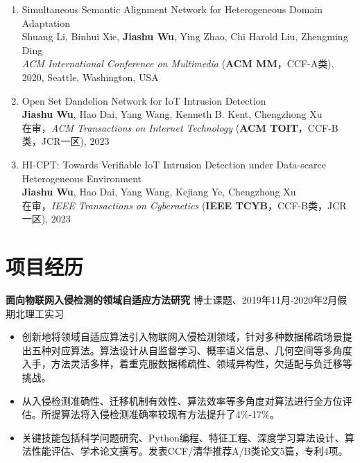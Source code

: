\documentclass[UTF8,letterpaper,11pt]{article}
\begin{document}
\begin{enumerate}
  \item Simultaneous Semantic Alignment Network for Heterogeneous Domain Adaptation\\
  Shuang Li, Binhui Xie, \textbf{Jiashu Wu}, Ying Zhao, Chi Harold Liu\textsuperscript{\Letter}, Zhengming Ding\\
  \textit{ACM International Conference on Multimedia} (\textbf{ACM MM}，CCF-A类), 2020, Seattle, Washington, USA

  \item Open Set Dandelion Network for IoT Intrusion Detection\\
  \textbf{Jiashu Wu}, Hao Dai, Yang Wang\textsuperscript{\Letter}, Kenneth B. Kent, Chengzhong Xu\\
  在审，\textit{ACM Transactions on Internet Technology} (\textbf{ACM TOIT}，CCF-B类，JCR一区), 2023

  \item HI-CPT: Towards Verifiable IoT Intrusion Detection under Data-scarce Heterogeneous Environment\\
  \textbf{Jiashu Wu}, Hao Dai, Yang Wang\textsuperscript{\Letter}, Kejiang Ye, Chengzhong Xu\\
  在审，\textit{IEEE Transactions on Cybernetics} (\textbf{IEEE TCYB}，CCF-B类，JCR一区), 2023
\end{enumerate}




\section{\textbf{项目经历}}

\textbf{面向物联网入侵检测的领域自适应方法研究} \hfill 博士课题、2019年11月-2020年2月假期北理工实习

\begin{itemize}
  \setlength\itemsep{2pt}
  \item 创新地将领域自适应算法引入物联网入侵检测领域，针对多种数据稀疏场景提出五种对应算法。算法设计从自监督学习、概率语义信息、几何空间等多角度入手，方法灵活多样，着重克服数据稀疏性、领域异构性，欠适配与负迁移等挑战。
  \item 从入侵检测准确性、迁移机制有效性、算法效率等多角度对算法进行全方位评估。所提算法将入侵检测准确率较现有方法提升了4\%-17\%。
  \item 关键技能包括科学问题研究、Python编程、特征工程、深度学习算法设计、算法性能评估、学术论文撰写。发表CCF/清华推荐A/B类论文5篇，专利4项。
\end{itemize}
\end{document}
